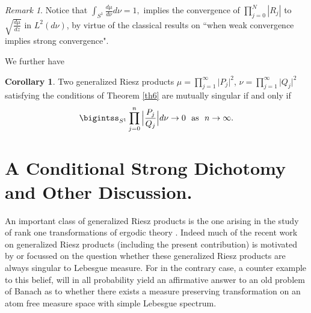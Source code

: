 \documentclass{amsart}
\theoremstyle{definition}
\newtheorem{Cor}[Th]{Corollary}
\theoremstyle{remark}
\newtheorem{rem}[Th]{Remark}
\numberwithin{equation}{section}
\newcommand{\ds}{\displaystyle}
\newcommand{\1}{\mathbb{1}}
\begin{document}
\begin{rem}\label{rem3}
\textnormal{Notice that
$\ds \int_{S^1} \frac{d\mu}{d\nu} d\nu=1,$
implies the convergence of $ \prod_{j=0}^{N}|R_j|$ to $ \sqrt{\frac{d\mu}{dz}}$ in $L^2(d\nu)$, by virtue of the classical results on ``when weak convergence implies strong convergence".}
\end{rem}
\noindent{}We further have \cite{Nadkarni1}
\begin{Cor}\label{cor3}
Two generalized Riesz products $\mu = \prod_{j=1}^\infty\big| P_j\big|^2$,
$\nu = \prod_{j=1}^\infty\big| Q_j\big|^2$  satisfying the conditions of Theorem \ref{th6} are mutually singular
if and only if $$\bigintss_{S^1} \prod_{j=0}^n\Big|\frac{P_j}{Q_j}\Big| d\nu \rightarrow 0~~ {\rm{as}} ~~n\rightarrow \infty.$$
\end{Cor}

\section{A Conditional Strong Dichotomy and Other Discussion.}

An important class of generalized Riesz products is the one arising in the study of rank one transformations of ergodic theory \cite{Nadkarni1}. Indeed much of the recent work on generalized Riesz products (including the present contribution) is motivated by or focussed on the question whether these
generalized Riesz products are always singular to Lebesgue measure. For in the contrary case, a counter example to this belief, will in all probability yield an affirmative answer to an old problem of Banach as to whether there exists a measure preserving transformation on an atom free measure space with simple Lebesgue spectrum.
\end{document}

